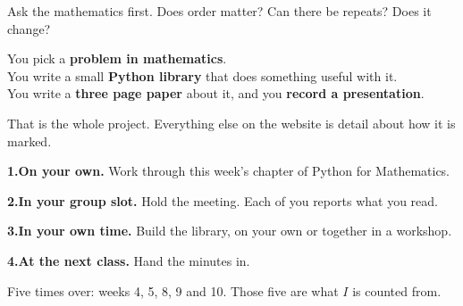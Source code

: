 {\small\color{inkgrey} Ask the mathematics first. Does order matter? Can
there be repeats? Does it change?}

\newpage
{}

\vspace{1.3cm}

\begin{center}
{\LARGE You pick a \textbf{problem in mathematics}.\\[0.7em]
 You write a small \textbf{Python library} that does something
 useful with it.\\[0.7em]
 You write a \textbf{three page paper} about it, and you
 \textbf{record a presentation}.}
\end{center}

\vspace{1.4cm}

\begin{center}
{\large\color{inkgrey} That is the whole project. Everything else on the
website is detail about how it is marked.}
\end{center}

\newpage
{}

\vspace{0.7cm}

{\LARGE
\textbf{\color{inkblue}1.}\quad \textbf{On your own.} Work through this
week's chapter of Python for Mathematics.

\vspace{0.8em}

\textbf{\color{inkteal}2.}\quad \textbf{In your group slot.} Hold the
meeting. Each of you reports what you read.

\vspace{0.8em}

\textbf{\color{inkred}3.}\quad \textbf{In your own time.} Build the
library, on your own or together in a workshop.

\vspace{0.8em}

\textbf{\color{inkblue}4.}\quad \textbf{At the next class.} Hand the
minutes in.}

\vspace{1.1cm}

{\large\color{inkgrey} Five times over: weeks 4, 5, 8, 9 and 10. Those
five are what \(I\) is counted from.}

